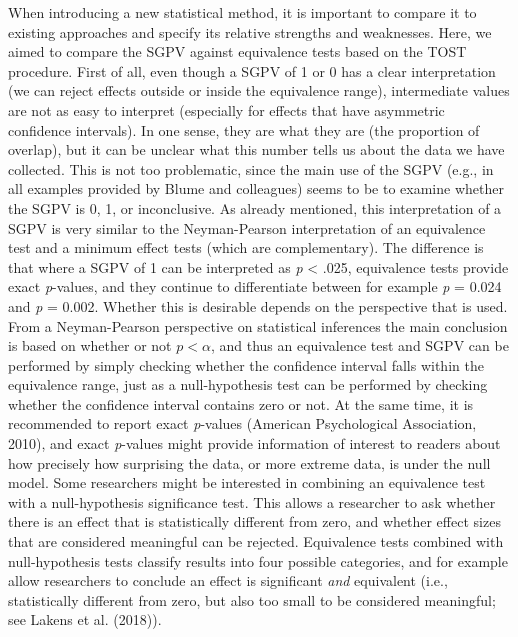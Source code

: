\documentclass[,man,floatsintext]{apa6}
\begin{document}
When introducing a new statistical method, it is important to compare it to existing approaches and specify its relative strengths and weaknesses. Here, we aimed to compare the SGPV against equivalence tests based on the TOST procedure. First of all, even though a SGPV of 1 or 0 has a clear interpretation (we can reject effects outside or inside the equivalence range), intermediate values are not as easy to interpret (especially for effects that have asymmetric confidence intervals). In one sense, they are what they are (the proportion of overlap), but it can be unclear what this number tells us about the data we have collected. This is not too problematic, since the main use of the SGPV (e.g., in all examples provided by Blume and colleagues) seems to be to examine whether the SGPV is 0, 1, or inconclusive. As already mentioned, this interpretation of a SGPV is very similar to the Neyman-Pearson interpretation of an equivalence test and a minimum effect tests (which are complementary). The difference is that where a SGPV of 1 can be interpreted as \emph{p} \textless{} .025, equivalence tests provide exact \emph{p}-values, and they continue to differentiate between for example \emph{p} = 0.024 and \emph{p} = 0.002. Whether this is desirable depends on the perspective that is used. From a Neyman-Pearson perspective on statistical inferences the main conclusion is based on whether or not \(p < \alpha\), and thus an equivalence test and SGPV can be performed by simply checking whether the confidence interval falls within the equivalence range, just as a null-hypothesis test can be performed by checking whether the confidence interval contains zero or not. At the same time, it is recommended to report exact \emph{p}-values (American Psychological Association, 2010), and exact \emph{p}-values might provide information of interest to readers about how precisely how surprising the data, or more extreme data, is under the null model. Some researchers might be interested in combining an equivalence test with a null-hypothesis significance test. This allows a researcher to ask whether there is an effect that is statistically different from zero, and whether effect sizes that are considered meaningful can be rejected. Equivalence tests combined with null-hypothesis tests classify results into four possible categories, and for example allow researchers to conclude an effect is significant \emph{and} equivalent (i.e., statistically different from zero, but also too small to be considered meaningful; see Lakens et al. (2018)).
\end{document}
